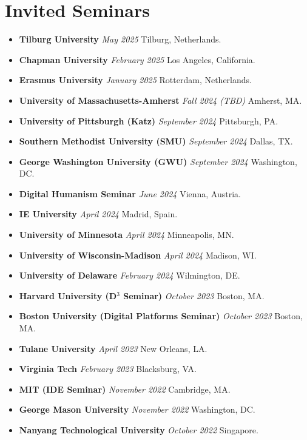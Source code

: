 \documentclass[10.5pt,letterpaper,sans]{moderncv}        %
\begin{document}
\section{Invited Seminars}

\begin{itemize}
\item \textbf{Tilburg University} \textit{May 2025} Tilburg, Netherlands.
\item \textbf{Chapman University} \textit{February 2025} Los Angeles, California.
\item \textbf{Erasmus University} \textit{January 2025} Rotterdam, Netherlands.
\item \textbf{University of Massachusetts-Amherst} \textit{Fall 2024 (TBD)} Amherst, MA.
\item \textbf{University of Pittsburgh (Katz)} \textit{September 2024} Pittsburgh, PA.
\item \textbf{Southern Methodist University (SMU)} \textit{September 2024} Dallas, TX.
\item \textbf{George Washington University (GWU)} \textit{September 2024} Washington, DC.
\item \textbf{Digital Humanism Seminar} \textit{June 2024} Vienna, Austria.
\item \textbf{IE University} \textit{April 2024} Madrid, Spain.
\item \textbf{University of Minnesota} \textit{April 2024} Minneapolis, MN.
\item \textbf{University of Wisconsin-Madison} \textit{April 2024} Madison, WI.
\item \textbf{University of Delaware} \textit{February 2024} Wilmington, DE.
\item \textbf{Harvard University (D$^3$ Seminar)} \textit{October 2023} Boston, MA.
\item \textbf{Boston University (Digital Platforms Seminar)} \textit{October 2023} Boston, MA.
\item \textbf{Tulane University} \textit{April 2023} New Orleans, LA.
\item \textbf{Virginia Tech} \textit{February 2023} Blacksburg, VA.
\item \textbf{MIT (IDE Seminar)} \textit{November 2022} Cambridge, MA.
\item \textbf{George Mason University} \textit{November 2022} Washington, DC.
\item \textbf{Nanyang Technological University} \textit{October 2022} Singapore.

\end{itemize}
\end{document}
